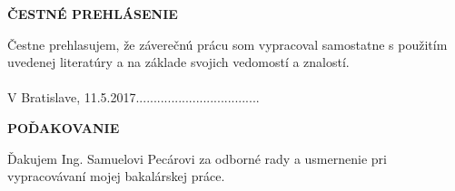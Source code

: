 \newpage

\thispagestyle{plain}
\vspace*{15cm}
\begin{large}
\noindent
\textbf{ČESTNÉ PREHLÁSENIE} \\
\end{large}
\noindent
Čestne prehlasujem, že záverečnú prácu som vypracoval samostatne s použitím uvedenej literatúry a na základe svojich vedomostí a znalostí.
\\
\vspace*{0.5cm}\\
V Bratislave, 11.5.2017\hspace*{6.5cm}...................................\\
\hspace*{10.7cm} \Author
\cleardoublepage
\thispagestyle{plain}
\vspace*{15cm}
\begin{large}
\noindent
\textbf{POĎAKOVANIE} \\
\end{large}
\noindent
Ďakujem Ing. Samuelovi Pecárovi za odborné rady a usmernenie pri vypracovávaní mojej bakalárskej práce.
\cleardoublepage
